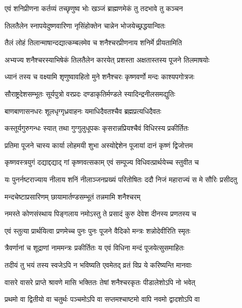 \twolineshloka
{एवं शनिप्रीणना कर्तव्यं तच्छृणुष्व भोः}
{खञ्जं ब्राह्मणमेकं तु तदभावे तु कञ्चन} %

\twolineshloka
{तिलतैलेन स्नापयेदुष्णवारिणा}
{नृसिंहोक्तेन चान्नेन भोजयेच्छ्रद्धयान्वितः} %

\twolineshloka
{तैलं लोहं तिलान्माषान्दद्यात्कम्बलमेव च}
{शनैश्चरप्रीणनाय शनिर्मे प्रीयतामिति} %

\twolineshloka
{अभ्यज्य शनैश्चरस्याभिषेकं तिलतैलेन कारयेत्}
{प्रशस्ता अक्षतास्तस्य पूजने तिलमाषयोः} %

\twolineshloka
{ध्यानं तस्य च वक्ष्यामि शृणुष्वावहितो मुने}
{शनैश्चरः कृष्णवर्णो मन्दः काश्यपगोत्रजः} %

\twolineshloka
{सौराष्ट्रदेशसम्भूतः सूर्यपुत्रो वरप्रदः}
{दण्डाकृतिर्मण्डले स्यादिन्द्रनीलसमद्युतिः} %

\twolineshloka
{बाणबाणासनधरः शूलधृग्गृध्रवाहनः}
{यमाधिदैवतश्चैव ब्रह्मप्रत्यधिदैवतः} %

\twolineshloka
{कस्तूर्यगुरुगन्धः स्यात् तथा गुग्गुलुधूपकः}
{कृसरान्नप्रियश्चैवं विधिरस्य प्रकीर्तितः} %

\twolineshloka
{प्रतिमा पूजने चास्य कार्या लोहमयी शुभा}
{अस्योद्देशेन पूजायां दानं कृष्णं द्विजोत्तम} %

\twolineshloka
{कृष्णवस्त्रयुगं दद्याद्दद्याद् गां कृष्णवत्सकाम्}
{एवं सम्पूज्य विधिवत्प्रार्थयेच्च स्तुवीत च} %

\twolineshloka
{यः पुनर्नष्टराज्याय नीलाय शनिं नीलाञ्जनप्रख्यं परितोषितः}
{ददौ निजं महाराज्यं स मे सौरिः प्रसीदतु} %

\twolineshloka
{मन्दचेष्टाप्रसारिणम्}
{छायामार्तण्डसम्भूतं तन्नमामि शनैश्चरम्} %

\twolineshloka
{नमस्ते कोणसंस्थाय पिङ्गलाय नमोऽस्तु ते}
{प्रसादं कुरु देवेश दीनस्य प्रणतस्य च} %

\twolineshloka
{एवं स्तुत्या प्रार्थयित्वा प्रणमेच्च पुनः पुनः}
{पूजने वैदिको मन्त्रः शन्नोदेवीरिति स्मृतः} %

\twolineshloka
{त्रैवर्णानां च शूद्राणां नाममन्त्रः प्रकीर्तितः}
{य एवं विधिना मन्दं पूजयेत्सुसमाहितः} %

\twolineshloka
{तदीयं तु भयं तस्य स्वजेऽपि न भविष्यति}
{एवमेतद् व्रतं विप्र ये करिष्यन्ति मानवाः} %

\twolineshloka
{वासरे वासरे प्राप्ते श्रावणे मासि भक्तितः}
{तेषां शनैश्चरकृतः पीडालेशोऽपि नो भवेत्} %

\twolineshloka
{प्रथमो वा द्वितीयो वा चतुर्थः पञ्चमोऽपि वा}
{सप्तमश्चाष्टमो वापि नवमो द्वादशोऽपि वा} %

